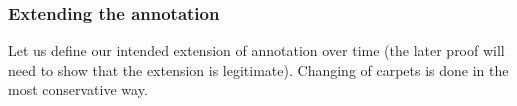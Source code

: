 \documentclass[12pt]{memoir}
\def\B{B}
\newcommand{\Z}{Z}
\newcommand{\cns}[1]{c_{\textrm{\upshape #1}}}
\begin{document}






\subsubsection{Extending the annotation}

Let us define our intended extension of annotation over time (the later proof will
need to show that the extension is legitimate).
Changing of carpets is done in the most conservative way.
\end{document}
